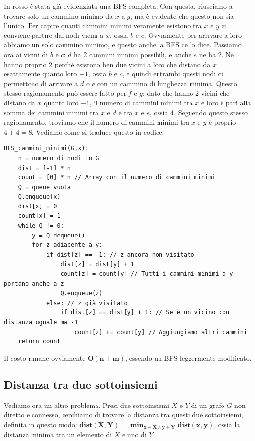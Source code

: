 \documentclass[11pt, a4paper, titlepage, oneside]{scrbook}
\begin{document}
In rosso è stata già evidenziata una BFS completa. Con questa, riusciamo a trovare solo un cammino minimo da $x$ a $y$, ma è evidente che questo non sia l'unico. Per capire quanti cammini minimi veramente esistono tra $x$ e $y$ ci conviene partire dai nodi vicini a $x$, ossia $b$ e $c$. Ovviamente per arrivare a loro abbiamo un solo cammino minimo, e questo anche la BFS ce lo dice. Passiamo ora ai vicini di $b$ e $c$: $d$ ha 2 cammini minimi possibili, e anche $e$ ne ha 2. Ne hanno proprio 2 perché esistono ben due vicini a loro che distano da $x$ esattamente quanto loro $-1$, ossia $b$ e $c$, e quindi entrambi questi nodi ci permettono di arrivare a $d$ o $e$ con un cammino di lunghezza minima. Questo stesso ragionamento può essere fatto per $f$ e $g$: dato che hanno 2 vicini che distano da $x$ quanto loro $-1$, il numero di cammini minimi tra $x$ e loro è pari alla somma dei cammini minimi tra $x$ e $d$ e tra $x$ e $e$, ossia 4. Seguendo questo stesso ragionamento, troviamo che il numero di cammini minimi tra $x$ e $y$ è proprio $4+4 = 8$. Vediamo come si traduce questo in codice:

\begin{lstlisting}
BFS_cammini_minimi(G,x):
    n = numero di nodi in G
    dist = [-1] * n
    count = [0] * n // Array con il numero di cammini minimi
    Q = queue vuota
    Q.enqueue(x)
    dist[x] = 0
    count[x] = 1
    while Q != 0:
        y = Q.dequeue()
        for z adiacente a y:
            if dist[z] == -1: // z ancora non visitato
                dist[z] = dist[y] + 1
                count[z] = count[y] // Tutti i cammini minimi a y portano anche a z
                Q.enqueue(z)
            else: // z già visitato
                if dist[z] == dist[y] + 1: // Se è un vicino con distanza uguale ma -1
                    count[z] += count[y] // Aggiungiamo altri cammini
    return count
\end{lstlisting}

Il costo rimane ovviamente $\textbf{O}\bm{(n+m)}$, essendo un BFS leggermente modificato.

\subsection{Distanza tra due sottoinsiemi}

Vediamo ora un altro problema. Presi due sottoinsiemi $X$ e $Y$ di un grafo $G$ non diretto e connesso, cerchiamo di trovare la distanza tra questi due sottoinsiemi, definita in questo modo: $\bm{dist(X,Y) = \min_{x \in X \land y \in Y} dist(x,y)}$, ossia la distanza minima tra un elemento di $X$ e uno di $Y$.
\end{document}
